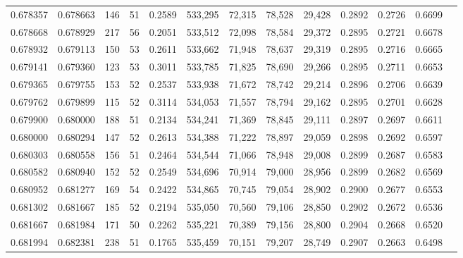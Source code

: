 \begin{tabular}{rrrrrrrrrrrrr}
0.678357 & 0.678663 &    146 &    51 &                                     0.2589 & 533,295 &  72,315 &  78,528 &  29,428 & 0.2892 & 0.2726 & 0.6699 \\
0.678668 & 0.678929 &    217 &    56 &                                     0.2051 & 533,512 &  72,098 &  78,584 &  29,372 & 0.2895 & 0.2721 & 0.6678 \\
0.678932 & 0.679113 &    150 &    53 &                                     0.2611 & 533,662 &  71,948 &  78,637 &  29,319 & 0.2895 & 0.2716 & 0.6665 \\
0.679141 & 0.679360 &    123 &    53 &                                     0.3011 & 533,785 &  71,825 &  78,690 &  29,266 & 0.2895 & 0.2711 & 0.6653 \\
0.679365 & 0.679755 &    153 &    52 &                                     0.2537 & 533,938 &  71,672 &  78,742 &  29,214 & 0.2896 & 0.2706 & 0.6639 \\
0.679762 & 0.679899 &    115 &    52 &                                     0.3114 & 534,053 &  71,557 &  78,794 &  29,162 & 0.2895 & 0.2701 & 0.6628 \\
0.679900 & 0.680000 &    188 &    51 &                                     0.2134 & 534,241 &  71,369 &  78,845 &  29,111 & 0.2897 & 0.2697 & 0.6611 \\
0.680000 & 0.680294 &    147 &    52 &                                     0.2613 & 534,388 &  71,222 &  78,897 &  29,059 & 0.2898 & 0.2692 & 0.6597 \\
0.680303 & 0.680558 &    156 &    51 &                                     0.2464 & 534,544 &  71,066 &  78,948 &  29,008 & 0.2899 & 0.2687 & 0.6583 \\
0.680582 & 0.680940 &    152 &    52 &                                     0.2549 & 534,696 &  70,914 &  79,000 &  28,956 & 0.2899 & 0.2682 & 0.6569 \\
0.680952 & 0.681277 &    169 &    54 &                                     0.2422 & 534,865 &  70,745 &  79,054 &  28,902 & 0.2900 & 0.2677 & 0.6553 \\
0.681302 & 0.681667 &    185 &    52 &                                     0.2194 & 535,050 &  70,560 &  79,106 &  28,850 & 0.2902 & 0.2672 & 0.6536 \\
0.681667 & 0.681984 &    171 &    50 &                                     0.2262 & 535,221 &  70,389 &  79,156 &  28,800 & 0.2904 & 0.2668 & 0.6520 \\
0.681994 & 0.682381 &    238 &    51 &                                     0.1765 & 535,459 &  70,151 &  79,207 &  28,749 & 0.2907 & 0.2663 & 0.6498 \\

\end{tabular}
